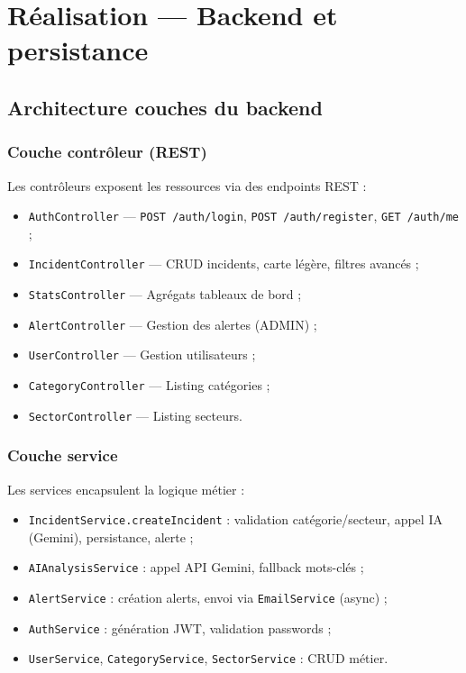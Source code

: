 \documentclass[12pt,a4paper,twoside,openright]{book}
\begin{document}
\chapter{Réalisation — Backend et persistance}
\label{chap:real}

\section{Architecture couches du backend}

\subsection{Couche contrôleur (REST)}
Les contrôleurs exposent les ressources via des endpoints REST :
\begin{itemize}
  \item \texttt{AuthController} — \texttt{POST /auth/login}, \texttt{POST /auth/register}, \texttt{GET /auth/me} ;
  \item \texttt{IncidentController} — CRUD incidents, carte légère, filtres avancés ;
  \item \texttt{StatsController} — Agrégats tableaux de bord ;
  \item \texttt{AlertController} — Gestion des alertes (ADMIN) ;
  \item \texttt{UserController} — Gestion utilisateurs ;
  \item \texttt{CategoryController} — Listing catégories ;
  \item \texttt{SectorController} — Listing secteurs.
\end{itemize}

\subsection{Couche service}
Les services encapsulent la logique métier :
\begin{itemize}
  \item \texttt{IncidentService.createIncident} : validation catégorie/secteur, appel IA (Gemini), persistance, alerte ;
  \item \texttt{AIAnalysisService} : appel API Gemini, fallback mots-clés ;
  \item \texttt{AlertService} : création alerts, envoi via \texttt{EmailService} (async) ;
  \item \texttt{AuthService} : génération JWT, validation passwords ;
  \item \texttt{UserService}, \texttt{CategoryService}, \texttt{SectorService} : CRUD métier.
\end{itemize}
\end{document}
